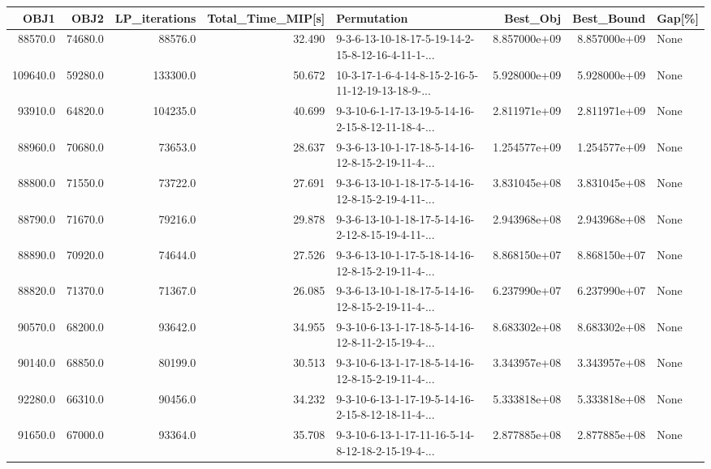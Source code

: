 \begin{tabular}{rrrrlrrl}
\toprule
     OBJ1 &     OBJ2 &  LP\_iterations &  Total\_Time\_MIP[s] &                                        Permutation &      Best\_Obj &    Best\_Bound & Gap[\%] \\
\midrule
  88570.0 &  74680.0 &        88576.0 &             32.490 &  9-3-6-13-10-18-17-5-19-14-2-15-8-12-16-4-11-1-... &  8.857000e+09 &  8.857000e+09 &   None \\
 109640.0 &  59280.0 &       133300.0 &             50.672 &  10-3-17-1-6-4-14-8-15-2-16-5-11-12-19-13-18-9-... &  5.928000e+09 &  5.928000e+09 &   None \\
  93910.0 &  64820.0 &       104235.0 &             40.699 &  9-3-10-6-1-17-13-19-5-14-16-2-15-8-12-11-18-4-... &  2.811971e+09 &  2.811971e+09 &   None \\
  88960.0 &  70680.0 &        73653.0 &             28.637 &  9-3-6-13-10-1-17-18-5-14-16-12-8-15-2-19-11-4-... &  1.254577e+09 &  1.254577e+09 &   None \\
  88800.0 &  71550.0 &        73722.0 &             27.691 &  9-3-6-13-10-1-18-17-5-14-16-12-8-15-2-19-4-11-... &  3.831045e+08 &  3.831045e+08 &   None \\
  88790.0 &  71670.0 &        79216.0 &             29.878 &  9-3-6-13-10-1-18-17-5-14-16-2-12-8-15-19-4-11-... &  2.943968e+08 &  2.943968e+08 &   None \\
  88890.0 &  70920.0 &        74644.0 &             27.526 &  9-3-6-13-10-1-17-5-18-14-16-12-8-15-2-19-11-4-... &  8.868150e+07 &  8.868150e+07 &   None \\
  88820.0 &  71370.0 &        71367.0 &             26.085 &  9-3-6-13-10-1-18-17-5-14-16-12-8-15-2-19-11-4-... &  6.237990e+07 &  6.237990e+07 &   None \\
  90570.0 &  68200.0 &        93642.0 &             34.955 &  9-3-10-6-13-1-17-18-5-14-16-12-8-11-2-15-19-4-... &  8.683302e+08 &  8.683302e+08 &   None \\
  90140.0 &  68850.0 &        80199.0 &             30.513 &  9-3-10-6-13-1-17-18-5-14-16-12-8-15-2-19-11-4-... &  3.343957e+08 &  3.343957e+08 &   None \\
  92280.0 &  66310.0 &        90456.0 &             34.232 &  9-3-10-6-13-1-17-19-5-14-16-2-15-8-12-18-11-4-... &  5.333818e+08 &  5.333818e+08 &   None \\
  91650.0 &  67000.0 &        93364.0 &             35.708 &  9-3-10-6-13-1-17-11-16-5-14-8-12-18-2-15-19-4-... &  2.877885e+08 &  2.877885e+08 &   None \\

\end{tabular}

